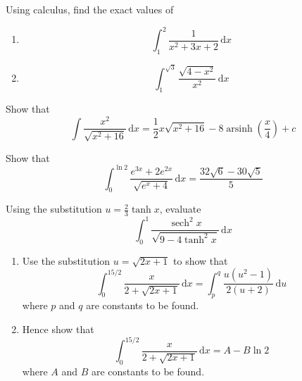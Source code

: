 \documentclass[leqno]{article}
\begin{document}
\begin{enumerate}[
  label=\textbf{\arabic*.},
  leftmargin=*,
  topsep=0pt,
  partopsep=0pt,
  parsep=0pt
]
Using calculus, find the exact values of \\
\begin{enumerate}[label=(\roman*)]
  \item
  \[
  \int_1^2 \frac{1}{x^2 + 3x + 2}\,\mathrm{d}x
  \]
  \item
  \[
  \int_1^{\sqrt{3}} \frac{\sqrt{4 - x^2}}{x^2}\,\mathrm{d}x
  \]
\end{enumerate}

\newpage

\questionitem

Show that
\[
\int \frac{x^2}{\sqrt{x^2 + 16}}\,\mathrm{d}x = \frac{1}{2}x\sqrt{x^2 + 16} - 8\operatorname{arsinh}\left(\frac{x}{4}\right) + c
\]

\newpage

\questionitem

Show that
\[
\int_0^{\ln 2} \frac{e^{3x}+2e^{2x}}{\sqrt{e^x+4}}\,\mathrm{d}x = \frac{32\sqrt{6}-30\sqrt{5}}{5}
\]

\newpage

\questionitem

Using the substitution $u = \frac{2}{3}\tanh x$, evaluate
\[
\int_0^1 \frac{\operatorname{sech}^2 x}{\sqrt{9 - 4\tanh^2 x}}\,\mathrm{d}x
\]

\newpage

\questionitem

\begin{enumerate}[label=\textbf{(\alph*)}]
  \item Use the substitution $u=\sqrt{2x+1}$ to show that
  \[
  \int_0^{15/2} \frac{x}{2+\sqrt{2x+1}}\,\mathrm{d}x = \int_p^q \frac{u(u^2-1)}{2(u+2)}\,\mathrm{d}u
  \]
  where $p$ and $q$ are constants to be found.
   \\
  \item Hence show that
  \[
  \int_0^{15/2} \frac{x}{2+\sqrt{2x+1}}\,\mathrm{d}x = A - B\ln 2
  \]
  where $A$ and $B$ are constants to be found.
\end{enumerate}

\newpage

\questionitem


\end{enumerate}
\end{document}
